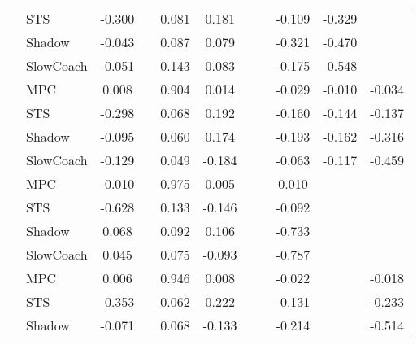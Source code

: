 \begin{tabular}{|l|l|*{9}{c|}}
                                                           & STS &   -0.300 &        &     0.081 &  0.181 &     &     &  -0.109 &  -0.329 &       \\
                                                           & Shadow &   -0.043 &        &     0.087 &  0.079 &     &     &  -0.321 &  -0.470 &       \\
                                                           & SlowCoach &   -0.051 &        &     0.143 &  0.083 &     &     &  -0.175 &  -0.548 &       \\
\midrule
[True, False, True, True, False, False, True, True, True] & MPC &    0.008 &        &     0.904 &  0.014 &     &     &  -0.029 &  -0.010 &   -0.034 \\
                                                           & STS &   -0.298 &        &     0.068 &  0.192 &     &     &  -0.160 &  -0.144 &   -0.137 \\
                                                           & Shadow &   -0.095 &        &     0.060 &  0.174 &     &     &  -0.193 &  -0.162 &   -0.316 \\
                                                           & SlowCoach &   -0.129 &        &     0.049 & -0.184 &     &     &  -0.063 &  -0.117 &   -0.459 \\
\midrule
[True, False, True, True, False, False, True, False, False] & MPC &   -0.010 &        &     0.975 &  0.005 &     &     &   0.010 &      &       \\
                                                           & STS &   -0.628 &        &     0.133 & -0.146 &     &     &  -0.092 &      &       \\
                                                           & Shadow &    0.068 &        &     0.092 &  0.106 &     &     &  -0.733 &      &       \\
                                                           & SlowCoach &    0.045 &        &     0.075 & -0.093 &     &     &  -0.787 &      &       \\
\midrule
[True, False, True, True, False, False, True, False, True] & MPC &    0.006 &        &     0.946 &  0.008 &     &     &  -0.022 &      &   -0.018 \\
                                                           & STS &   -0.353 &        &     0.062 &  0.222 &     &     &  -0.131 &      &   -0.233 \\
                                                           & Shadow &   -0.071 &        &     0.068 & -0.133 &     &     &  -0.214 &      &   -0.514 \\

\end{tabular}
